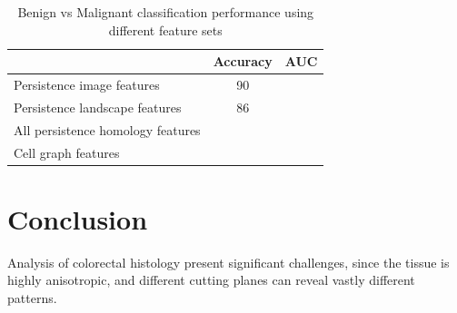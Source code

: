 \documentclass{article}
\begin{document}
\begin{table}[h]
\centering
\begin{tabular}{|l|c|c|}
\hline
 & \textbf{Accuracy} & \textbf{AUC} \\ \hline
Persistence image features & 90 &  \\ \hline
Persistence landscape features & 86 &  \\ \hline
All persistence homology features &  &  \\ \hline
Cell graph features &  &  \\ \hline
\end{tabular}
\caption{Benign vs Malignant classification performance using different feature sets}
\label{tab:cancer_diagnosis_result}
\end{table}


\section{Conclusion}
\label{sec:conclusion}

Analysis of colorectal histology present significant challenges, since the tissue is highly anisotropic, and different cutting planes can reveal vastly different patterns.



\end{document}
